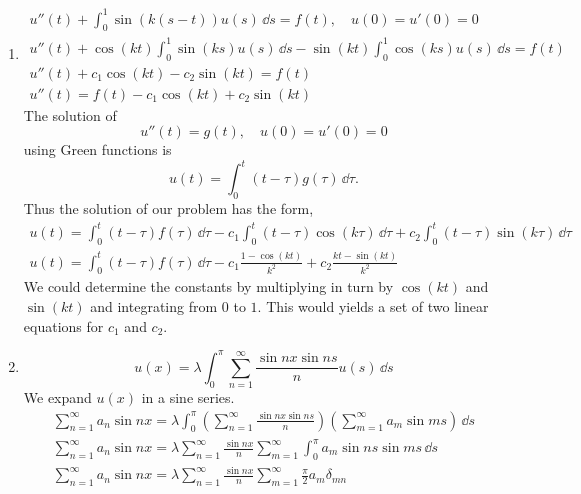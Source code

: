 \begin{Solution}
  \begin{enumerate}
  \item
    \begin{gather*}
      u''(t) + \int_0^1 \sin(k(s-t)) u(s) \,\dd s = f(t), \quad u(0) = u'(0) = 0 \\
      u''(t) + \cos(k t) \int_0^1 \sin(k s) u(s) \,\dd s 
      - \sin(k t) \int_0^1 \cos(k s) u(s) \,\dd s = f(t) \\
      u''(t) + c_1 \cos(k t) - c_2 \sin(k t) = f(t) \\
      u''(t) = f(t) - c_1 \cos(k t) + c_2 \sin(k t) 
    \end{gather*}
    The solution of 
    \[
    u''(t) = g(t), \quad u(0) = u'(0) = 0
    \]
    using Green functions is
    \[
    u(t) = \int_0^t (t - \tau) g( \tau ) \,\dd \tau.
    \]
    Thus the solution of our problem has the form,
    \begin{gather*}
      u(t) = \int_0^t (t-\tau) f(\tau) \,\dd \tau 
      - c_1 \int_0^t (t - \tau) \cos(k \tau) \,\dd \tau
      + c_2 \int_0^t (t - \tau) \sin(k \tau) \,\dd \tau \\
      \boxed{
        u(t) = \int_0^t (t-\tau) f(\tau) \,\dd \tau 
        - c_1 \frac{1 - \cos(k t)}{k^2}
        + c_2 \frac{k t - \sin(k t)}{ k^2 }
        }
    \end{gather*}
    We could determine the constants by multiplying in turn by $\cos(k t)$ 
    and $\sin(k t)$ and integrating from $0$ to $1$.  This would yields a set 
    of two linear equations for $c_1$ and $c_2$.
  \item
    \[
    u(x) = \lambda \int_0^\pi \sum_{n = 1}^\infty \frac{ \sin n x \sin n s }{ n } u(s) \,\dd s
    \]
    We expand $u(x)$ in a sine series.
    \begin{gather*}
      \sum_{n = 1}^\infty a_n \sin n x 
      = \lambda \int_0^\pi \left( \sum_{n = 1}^\infty \frac{ \sin n x \sin n s }{ n } 
      \right) \left( \sum_{m = 1}^\infty a_m \sin m s \right) \,\dd s \\
      \sum_{n = 1}^\infty a_n \sin n x 
      = \lambda \sum_{n = 1}^\infty \frac{ \sin n x }{ n } \sum_{m = 1}^\infty \int_0^\pi 
      a_m \sin n s \sin m s \,\dd s \\
      \sum_{n = 1}^\infty a_n \sin n x 
      = \lambda \sum_{n = 1}^\infty \frac{ \sin n x }{ n } \sum_{m = 1}^\infty \frac{\pi}{2}
      a_m \delta_{m n} \\

\end{gather*}
\end{enumerate}
\end{Solution}
